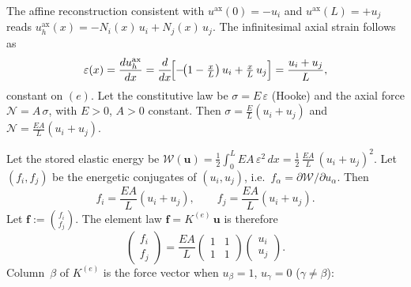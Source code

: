 \documentclass[11pt, a4paper]{article}
\begin{document}
The affine reconstruction consistent with $u^{\mathrm{ax}}(0)=-u_i$ and $u^{\mathrm{ax}}(L)=+u_j$ reads $u^{\mathrm{ax}}_h(x)=-N_i(x)\,u_i+N_j(x)\,u_j$.  The infinitesimal axial strain follows as
\[
\varepsilon(x)=\frac{du^{\mathrm{ax}}_h}{dx}
=\frac{d}{dx}\!\Bigl[-\!\bigl(1-\tfrac{x}{L}\bigr)\,u_i+\tfrac{x}{L}\,u_j\Bigr]
=\frac{u_i+u_j}{L},
\]
constant on $(e)$.  Let the constitutive law be $\sigma=E\,\varepsilon$ (Hooke) and the axial force $\mathcal{N}=A\,\sigma$, with $E>0$, $A>0$ constant.  Then $\sigma=\frac{E}{L}(u_i+u_j)$ and $\mathcal{N}=\frac{EA}{L}(u_i+u_j)$.

Let the stored elastic energy be $\mathcal{W}(\mathbf{u})=\frac{1}{2}\int_0^L EA\,\varepsilon^2\,dx=\frac{1}{2}\,\frac{EA}{L}\,(u_i+u_j)^2$.  Let $(f_i,f_j)$ be the energetic conjugates of $(u_i,u_j)$, i.e.\ $f_\alpha=\partial\mathcal{W}/\partial u_\alpha$.  Then
\[
f_i=\frac{EA}{L}(u_i+u_j),\qquad f_j=\frac{EA}{L}(u_i+u_j).
\]
Let $\mathbf{f}:=\binom{f_i}{f_j}$.  The element law $\mathbf{f}=K^{(e)}\,\mathbf{u}$ is therefore
\[
\boxed{
\begin{pmatrix} f_i\\[2pt] f_j\end{pmatrix}
=\frac{EA}{L}
\begin{pmatrix} 1 & 1\\[2pt] 1 & 1\end{pmatrix}
\begin{pmatrix} u_i\\[2pt] u_j\end{pmatrix}.
}
\]
Column~$\beta$ of $K^{(e)}$ is the force vector when $u_\beta=1$, $u_\gamma=0$ ($\gamma\neq\beta$):
\end{document}
